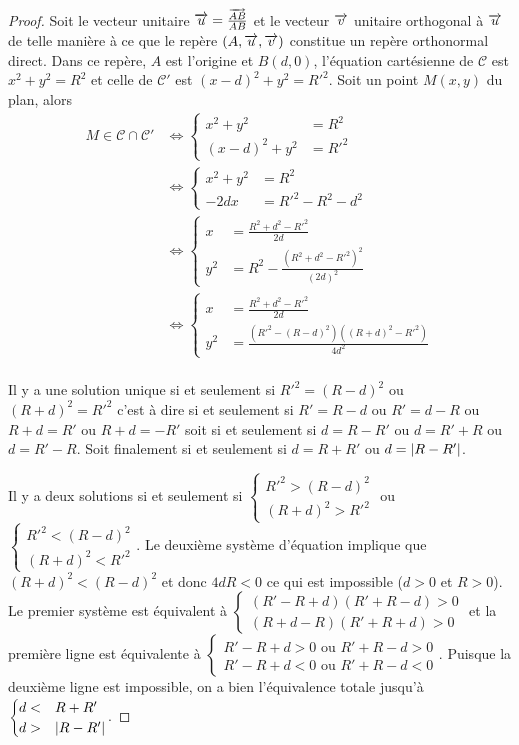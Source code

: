 \begin{proof}
  Soit le vecteur unitaire $\overrightarrow{u}=\frac{\overrightarrow{AB}}{AB}$ et le vecteur $\overrightarrow{v}$ unitaire orthogonal à $\overrightarrow{u}$ de telle manière à ce que le repère $(A,\overrightarrow{u},\overrightarrow{v})$ constitue un repère orthonormal direct. Dans ce repère, $A$ est l'origine et $B(d,0)$, l'équation cartésienne de $\mathcal{C}$ est $x^2+y^2=R^2$ et celle de $\mathcal{C}'$ est $(x-d)^2+y^2=R'^2$. Soit un point $M(x,y)$ du plan, alors
  \begin{align}
    M \in \mathcal{C} \cap \mathcal{C}' &\iff \begin{cases} x^2+y^2&=R^2 \\ (x-d)^2+y^2 &=R'^2\end{cases}\\
&\iff \begin{cases} x^2+y^2&=R^2 \\ -2dx &=R'^2-R^2-d^2\end{cases}\\
&\iff \begin{cases} x&=\frac{R^2+d^2-R'^2}{2d} \\ y^2&=R^2-\frac{(R^2+d^2-R'^2)^2}{(2d)^2}\end{cases}\\
&\iff \begin{cases} x&=\frac{R^2+d^2-R'^2}{2d} \\ y^2&=\frac{(R'^2-(R-d)^2)((R+d)^2-R'^2)}{4d^2}\end{cases}\\
  \end{align}

Il y a une solution unique si et seulement si $R'^2=(R-d)^2$ ou $(R+d)^2=R'^2$ c'est à dire si et seulement si $R'=R-d$ ou $R'=d-R$ ou $R+d=R'$ ou $R+d=-R'$ soit si et seulement si $d=R-R'$ ou $d=R'+R$ ou $d=R'-R$. Soit finalement si et seulement si $d=R+R'$ ou $d=\left\lvert R-R'\right\rvert$.

Il y a deux solutions si et seulement si $\begin{cases}R'^2 > (R-d)^2 \\ (R+d)^2>R'^2\end{cases}$ ou $\begin{cases}R'^2 < (R-d)^2 \\ (R+d)^2<R'^2\end{cases}$.
Le deuxième système d'équation implique que $(R+d)^2<(R-d)^2$ et donc $4dR<0$ ce qui est impossible ($d>0$ et $R>0$).
Le premier système est équivalent à $\begin{cases}(R'-R+d)(R'+R-d) > 0 \\ (R+d-R)(R'+R+d)>0\end{cases}$ et la première ligne est équivalente à $\begin{cases} R'-R+d>0 \text{~ou~} R'+R-d> 0 \\ R'-R+d<0 \text{~ou~} R'+R-d<0\end{cases}$. Puisque la deuxième ligne est impossible, on a bien l'équivalence totale jusqu'à $\begin{cases}d <& R+R' \\ d>&\left\lvert R-R'\right\rvert\end{cases}$.
\end{proof}

